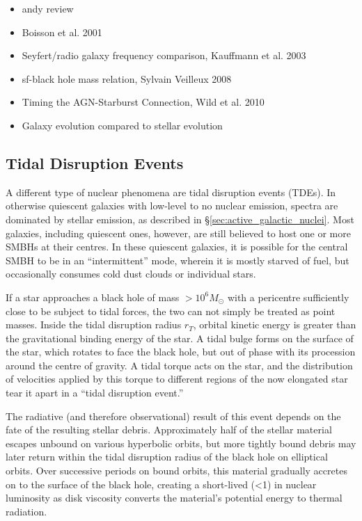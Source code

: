 \documentclass[a4paper,11pt]{article}
\begin{document}
\begin{itemize}
  \item andy review \cite{Lawrence_1987}
  \item Boisson et al. 2001 \cite{Boisson_2001}
  \item Seyfert/radio galaxy frequency comparison, Kauffmann et al. 2003 \cite{Kauffmann_2003}
  \item sf-black hole mass relation, Sylvain Veilleux 2008 \cite{Veilleux_2008}
  \item Timing the AGN-Starburst Connection, Wild et al. 2010 \cite{Wild_2010}
  \item Galaxy evolution compared to stellar evolution\cite{Mo_2010}
\end{itemize}

\subsection{Tidal Disruption Events}\label{sec:tidal_disruption_events}

A different type of nuclear phenomena are tidal disruption events (TDEs). In otherwise quiescent galaxies with low-level to no nuclear emission, spectra are dominated by stellar emission, as described in \S \ref{sec:active_galactic_nuclei}. Most galaxies, including quiescent ones, however, are still believed to host one or more SMBHs at their centres.\cite{Rees_1988} In these quiescent galaxies, it is possible for the central SMBH to be in an ``intermittent'' mode, wherein it is mostly starved of fuel, but occasionally consumes cold dust clouds or individual stars.\cite{Holoien_2016a, Rees_1988, Evans_1989}

If a star approaches a black hole of mass $>10^6M_\odot$ with a pericentre sufficiently close to be subject to tidal forces, the two can not simply be treated as point masses. Inside the tidal disruption radius $r_T$, orbital kinetic energy is greater than the gravitational binding energy of the star. A tidal bulge forms on the surface of the star, which rotates to face the black hole, but out of phase with its procession around the centre of gravity. A tidal torque acts on the star, and the distribution of velocities applied by this torque to different regions of the now elongated star tear it apart in a ``tidal disruption event.''\cite{Rees_1988, Evans_1989}

The radiative (and therefore observational) result of this event depends on the fate of the resulting stellar debris. Approximately half of the stellar material escapes unbound on various hyperbolic orbits, but more tightly bound debris may later return within the tidal disruption radius of the black hole on elliptical orbits.\cite{Rees_1988} Over successive periods on bound orbits, this material gradually accretes on to the surface of the black hole, creating a short-lived (\textless\SI{1}{\year}) in nuclear luminosity as disk viscosity converts the material's potential energy to thermal radiation.\cite{Evans_1989}
\end{document}
